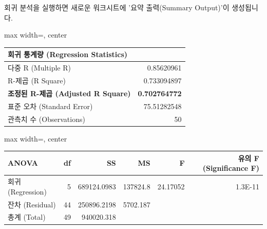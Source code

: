 \documentclass[11pt,a4paper]{book}
\theoremstyle{definition}
\begin{document}
\begin{tcolorbox}[title={\textbf{초기 Excel 출력 결과 해석}}]
회귀 분석을 실행하면 새로운 워크시트에 '요약 출력(Summary Output)'이 생성됩니다.

\begin{adjustbox}{max width=\textwidth, center}
\begin{tabular}{l r}
\toprule
\textbf{회귀 통계량 (Regression Statistics)} & \\
\midrule
다중 R (Multiple R) & 0.85620961 \\
R-제곱 (R Square) & 0.733094897 \\
\textbf{조정된 R-제곱 (Adjusted R Square)} & \textbf{0.702764772} \\
표준 오차 (Standard Error) & 75.51282548 \\
관측치 수 (Observations) & 50 \\
\bottomrule
\end{tabular}
\end{adjustbox}

\vspace{0.5em}

\begin{adjustbox}{max width=\textwidth, center}
\begin{tabular}{l r r r r r}
\toprule
\textbf{ANOVA} & \textbf{df} & \textbf{SS} & \textbf{MS} & \textbf{F} & \textbf{유의 F (Significance F)} \\
\midrule
회귀 (Regression) & 5 & 689124.0983 & 137824.8 & 24.17052 & 1.3E-11 \\
잔차 (Residual) & 44 & 250896.2198 & 5702.187 & & \\
총계 (Total) & 49 & 940020.318 & & & \\
\bottomrule
\end{tabular}
\end{adjustbox}

\vspace{0.5em}


\end{tcolorbox}
\end{document}
